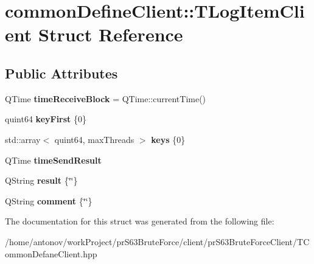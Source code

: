 \hypertarget{structcommon_define_client_1_1_t_log_item_client}{}\section{common\+Define\+Client\+:\+:T\+Log\+Item\+Client Struct Reference}
\label{structcommon_define_client_1_1_t_log_item_client}
\subsection*{Public Attributes}
\begin{DoxyCompactItemize}
\item 
\mbox{\label{structcommon_define_client_1_1_t_log_item_client_ab2a6064d43c8dbe637188b3c9b7835a9}} 
Q\+Time {\bfseries time\+Receive\+Block} = Q\+Time\+::current\+Time()
\item 
\mbox{\label{structcommon_define_client_1_1_t_log_item_client_aa8d3e11c4173fcd797ce8e8c53d93c8b}} 
quint64 {\bfseries key\+First} \{0\}
\item 
\mbox{\label{structcommon_define_client_1_1_t_log_item_client_abe6f35c52279fda23abce2af8ba3da9c}} 
std\+::array$<$ quint64, max\+Threads $>$ {\bfseries keys} \{0\}
\item 
\mbox{\label{structcommon_define_client_1_1_t_log_item_client_a39a08024bb4f93474f739c4e2636fbe8}} 
Q\+Time {\bfseries time\+Send\+Result}
\item 
\mbox{\label{structcommon_define_client_1_1_t_log_item_client_a237d46da9198f1a7ad87554186f17f20}} 
Q\+String {\bfseries result} \{\char`\"{}\char`\"{}\}
\item 
\mbox{\label{structcommon_define_client_1_1_t_log_item_client_aff95ec817ac3bf87604ed616edf7c4e1}} 
Q\+String {\bfseries comment} \{\char`\"{}\char`\"{}\}
\end{DoxyCompactItemize}


The documentation for this struct was generated from the following file\+:\begin{DoxyCompactItemize}
\item 
/home/antonov/work\+Project/pr\+S63\+Brute\+Force/client/pr\+S63\+Brute\+Force\+Client/T\+Common\+Defane\+Client.\+hpp\end{DoxyCompactItemize}
